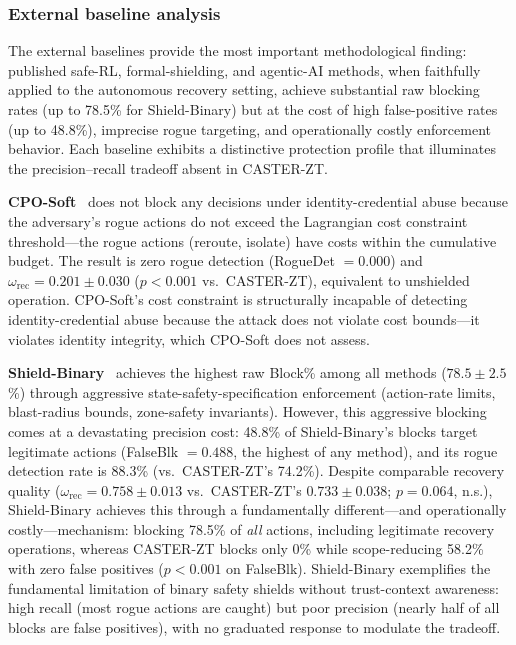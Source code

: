 \documentclass[10pt,journal,compsoc]{IEEEtran}
\begin{document}
\subsubsection{External baseline analysis}

The external baselines provide the most important methodological finding: published safe-RL, formal-shielding, and agentic-AI methods, when faithfully applied to the autonomous recovery setting, achieve substantial raw blocking rates (up to 78.5\% for Shield-Binary) but at the cost of high false-positive rates (up to 48.8\%), imprecise rogue targeting, and operationally costly enforcement behavior.
Each baseline exhibits a distinctive protection profile that illuminates the precision--recall tradeoff absent in CASTER-ZT.

\noindent\textbf{CPO-Soft}~\cite{achiam2017cpo} does not block any decisions under identity-credential abuse because the adversary's rogue actions do not exceed the Lagrangian cost constraint threshold---the rogue actions (reroute, isolate) have costs within the cumulative budget.
The result is zero rogue detection (RogueDet $= 0.000$) and $\omega_{\mathrm{rec}} = 0.201\pm0.030$ ($p < 0.001$ vs.\ CASTER-ZT), equivalent to unshielded operation.
CPO-Soft's cost constraint is structurally incapable of detecting identity-credential abuse because the attack does not violate cost bounds---it violates identity integrity, which CPO-Soft does not assess.

\noindent\textbf{Shield-Binary}~\cite{alshiekh2018shielding} achieves the highest raw Block\% among all methods ($78.5\pm2.5$\%) through aggressive state-safety-specification enforcement (action-rate limits, blast-radius bounds, zone-safety invariants).
However, this aggressive blocking comes at a devastating precision cost: 48.8\% of Shield-Binary's blocks target legitimate actions (FalseBlk $= 0.488$, the highest of any method), and its rogue detection rate is 88.3\% (vs.\ CASTER-ZT's 74.2\%).
Despite comparable recovery quality ($\omega_{\mathrm{rec}} = 0.758\pm0.013$ vs.\ CASTER-ZT's $0.733\pm0.038$; $p = 0.064$, n.s.), Shield-Binary achieves this through a fundamentally different---and operationally costly---mechanism: blocking 78.5\% of \emph{all} actions, including legitimate recovery operations, whereas CASTER-ZT blocks only 0\% while scope-reducing 58.2\% with zero false positives ($p < 0.001$ on FalseBlk).
Shield-Binary exemplifies the fundamental limitation of binary safety shields without trust-context awareness: high recall (most rogue actions are caught) but poor precision (nearly half of all blocks are false positives), with no graduated response to modulate the tradeoff.
\end{document}
